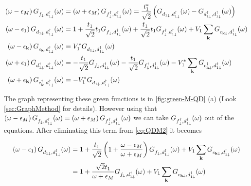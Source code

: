 \begin{align}
    \left(\omega-\epsilon_{M}\right)G_{f_{\downarrow},d_{1\downarrow}^{\dagger}}(\omega)&=\left(\omega+\epsilon_{M}\right)G_{f_{\downarrow}^{\dagger},d_{1\downarrow}^{\dagger}}(\omega)=\frac{t^*_1}{\sqrt{2}}\left(G_{d_{1\downarrow},d_{1\downarrow}^{\dagger}}(\omega)-G_{d_{1\downarrow}^{\dagger},d_{1\downarrow}^{\dagger}}(\omega)\right) \label{eq:QDM1} \\ 
    \left(\omega-\epsilon_{1}\right)G_{d_{1\downarrow},d_{1\downarrow}^{\dagger}}(\omega)&=1+\frac{t_1}{\sqrt{2}}t_{1}G_{f_{\downarrow},d_{1\downarrow}^{\dagger}}(\omega)+\frac{t_1}{\sqrt{2}}t_{1}G_{f_{\downarrow}^{\dagger},d_{1\downarrow}^{\dagger}}(\omega)+V_{1}\sum_{\mathbf{k}}G_{c_{\mathbf{k\downarrow}},d_{1\downarrow}^{\dagger}}(\omega) \label{eq:QDM2} \\ 
    \left(\omega-\epsilon_{\mathbf{k}}\right)G_{c_{\mathbf{k}},d_{1\downarrow}^{\dagger}}(\omega)&=V_{1}^{*}G_{d_{1\downarrow},d_{1\downarrow}^{\dagger}}(\omega)\label{eq:QDM3} \\
    \left(\omega+\epsilon_{1}\right)G_{d_{1\downarrow}^{\dagger},d_{1\downarrow}^{\dagger}}(\omega)&=-\frac{t_1}{\sqrt{2}}G_{f_{\downarrow},d_{1\downarrow}^{\dagger}}(\omega)-\frac{t_1}{\sqrt{2}}G_{f_{\downarrow}^{\dagger},d_{1\downarrow}^{\dagger}}(\omega)-V_{1}^{*}\sum_{\mathbf{k}}G_{c_{\mathbf{k\downarrow}}^{\dagger},d_{1\downarrow}^{\dagger}}(\omega) \label{eq:QDM4} \\
    \left(\omega+\epsilon_{\mathbf{k}}\right)G_{c^\dagger_{\mathbf{k}},d_{1\downarrow}^{\dagger}}(\omega)&=-V_{1}^{*}G_{d_{1\downarrow},d_{1\downarrow}^{\dagger}}(\omega) \label{eq:QDM5}
\end{align}

The graph representing these green functions is in \ref{fig:green-M-QD} (a)  (Look \ref{sec:GraphMethod} for details). However using that $\left(\omega-\epsilon_{M}\right)G_{f_{\downarrow},d_{1\downarrow}^{\dagger}}(\omega)=\left(\omega+\epsilon_{M}\right)G_{f_{\downarrow}^{\dagger},d_{1\downarrow}^{\dagger}}(\omega)$ we can take
 $G_{f_{\downarrow}^{\dagger},d_{1\downarrow}^{\dagger}}(\omega)$ out of the equations. After eliminating this term from \eqref{eq:QDM2} it becomes
 
 \begin{align}
\left(\omega-\epsilon_{1}\right)G_{d_{1\downarrow},d_{1\downarrow}^{\dagger}}(\omega)&=1+\frac{t_{1}}{\sqrt{2}}\left(1+\frac{\omega-\epsilon_{M}}{\omega+\epsilon_{M}}\right)G_{f_{\downarrow},d_{1\downarrow}^{\dagger}}(\omega)+V_{1}\sum_{\mathbf{k}}G_{c_{\mathbf{k\downarrow}},d_{1\downarrow}^{\dagger}}(\omega) \\
&=1+\frac{\sqrt{2}t_{1}}{\omega+\epsilon_{M}}G_{f_{\downarrow},d_{1\downarrow}^{\dagger}}(\omega)+V_{1}\sum_{\mathbf{k}}G_{c_{\mathbf{k\downarrow}},d_{1\downarrow}^{\dagger}}(\omega)
\end{align}

